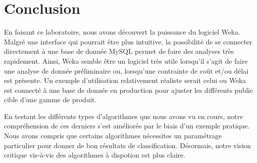 \chapter{Conclusion}

En faisant ce laboratoire, nous avons découvert la puissance du logiciel Weka. Malgré une interface qui pourrait être plus intuitive, la possibilité de se connecter directement à une base de donnée MySQL permet de faire des analyses très rapidement. Ainsi, Weka semble être un logiciel très utile lorsqu'il s'agit de faire une analyse de donnée préliminaire ou, lorsqu'une contrainte de coût et/ou délai est présente. Un exemple d'utilisation relativement réaliste serait celui ou Weka est connecté à une base de donnée en production pour ajuster les différents public cible d'une gamme de produit.

En testant les différents types d'algorithmes que nous avons vu en cours, notre compréhension de ces derniers s'est améliorée par le biais d'un exemple pratique. Nous avons compris que certains algorithmes nécessites un paramétrage particulier pour donner de bon résultats de classification. Désormais, notre vision critique vis-à-vis des algorithmes à dispotion est plus claire.